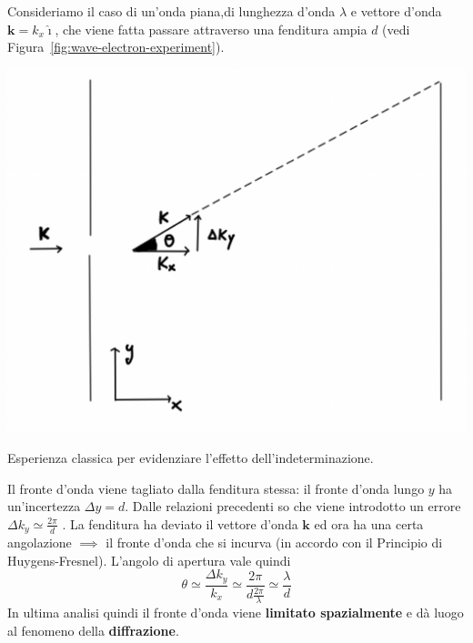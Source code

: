 Consideriamo il caso di un'onda piana,di lunghezza d'onda \(\lambda\) e
vettore d'onda \(\bm{k} = k_x \hat{\imath}\), che viene fatta passare
attraverso una fenditura ampia \(d\) (vedi Figura~\ref{fig:wave-electron-experiment}).

\begin{marginfigure}
    \includegraphics{figs/wave-electron-experiment}
    \caption{Esperienza classica per evidenziare l'effetto dell'indeterminazione.}
    \label{fig:wave-electron-experiment}
\end{marginfigure}

Il fronte d'onda viene tagliato dalla fenditura stessa: il fronte d'onda
lungo \(y\) ha un'incertezza \(\Delta y = d\).
Dalle relazioni
precedenti so che viene introdotto un errore
\(\Delta k_{y} \simeq\frac{2\pi}{d}\) .
La fenditura ha deviato il
vettore d'onda \(\bm{k}\) ed ora ha una certa angolazione \(\implies\)
il fronte d'onda che si incurva (in accordo con il Principio di Huygens-Fresnel).
L'angolo di apertura vale quindi \[
                                     \theta \simeq\frac{\Delta k_{y}}{k_{x}} \simeq \frac{2\pi}{d  \frac{2\pi}{\lambda}} \simeq\frac{\lambda}{d}
\] In ultima analisi quindi il fronte d'onda viene \textbf{limitato
spazialmente} e dà luogo al fenomeno della \textbf{diffrazione}.

